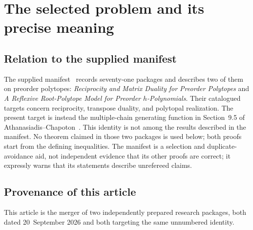\documentclass[11pt]{article}
\numberwithin{equation}{section}
\theoremstyle{definition}
\begin{document}
\clearpage
\tableofcontents
\clearpage

\section{The selected problem and its precise meaning}
\label{sec:problem}

\subsection{Relation to the supplied manifest}
The supplied manifest~\cite{manifest} records seventy-one packages and
describes two of them on preorder polytopes: \emph{Reciprocity and Matrix
Duality for Preorder Polytopes} and \emph{A Reflexive Root-Polytope Model for
Preorder $h$-Polynomials}. Their catalogued targets concern reciprocity,
transpose duality, and polytopal realization. The present target is instead
the multiple-chain generating function in Section~9.5 of
Athanasiadis--Chapoton~\cite{AC}. This identity is not among the results
described in the manifest. No theorem claimed in those two packages is used
below; both proofs start from the defining inequalities. The manifest is a
selection and duplicate-avoidance aid, not independent evidence that its other
proofs are correct; it expressly warns that its statements describe unrefereed
claims.

\subsection{Provenance of this article}
\label{sec:provenance}
This article is the merger of two independently prepared research packages,
both dated 20~September 2026 and both targeting the same unnumbered identity.
\end{document}
